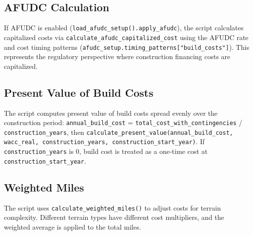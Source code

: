 \documentclass[ctcc_full_documentation.tex]{subfiles}
\begin{document}
\subsection{AFUDC Calculation}

If AFUDC is enabled (\texttt{load\_afudc\_setup().apply\_afudc}), the script calculates capitalized costs via \texttt{calculate\_afudc\_capitalized\_cost} using the AFUDC rate and cost timing patterns (\texttt{afudc\_setup.timing\_patterns["build\_costs"]}). This represents the regulatory perspective where construction financing costs are capitalized.

\subsection{Present Value of Build Costs}

The script computes present value of build costs spread evenly over the construction period: \texttt{annual\_build\_cost} = \texttt{total\_cost\_with\_contingencies} / \texttt{construction\_years}, then \texttt{calculate\_present\_value(annual\_build\_cost, wacc\_real, construction\_years, construction\_start\_year)}. If \texttt{construction\_years} is 0, build cost is treated as a one-time cost at \texttt{construction\_start\_year}.

\subsection{Weighted Miles}

The script uses \texttt{calculate\_weighted\_miles()} to adjust costs for terrain complexity. Different terrain types have different cost multipliers, and the weighted average is applied to the total miles.
\end{document}
